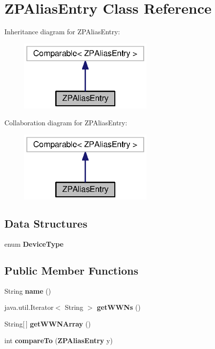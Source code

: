 \section{Z\-P\-Alias\-Entry Class Reference}
\label{classorg_1_1smallfoot_1_1parser_1_1zone_1_1ZPAliasEntry}


Inheritance diagram for Z\-P\-Alias\-Entry\-:\nopagebreak
\begin{figure}[H]
\begin{center}
\leavevmode
\includegraphics[width=188pt]{classorg_1_1smallfoot_1_1parser_1_1zone_1_1ZPAliasEntry__inherit__graph}
\end{center}
\end{figure}


Collaboration diagram for Z\-P\-Alias\-Entry\-:\nopagebreak
\begin{figure}[H]
\begin{center}
\leavevmode
\includegraphics[width=188pt]{classorg_1_1smallfoot_1_1parser_1_1zone_1_1ZPAliasEntry__coll__graph}
\end{center}
\end{figure}
\subsection*{Data Structures}
\begin{DoxyCompactItemize}
\item 
enum {\bf Device\-Type}
\end{DoxyCompactItemize}
\subsection*{Public Member Functions}
\begin{DoxyCompactItemize}
\item 
String {\bf name} ()
\item 
java.\-util.\-Iterator$<$ String $>$ {\bf get\-W\-W\-Ns} ()
\item 
String[$\,$] {\bf get\-W\-W\-N\-Array} ()
\item 
int {\bf compare\-To} ({\bf Z\-P\-Alias\-Entry} y)
\end{DoxyCompactItemize}


